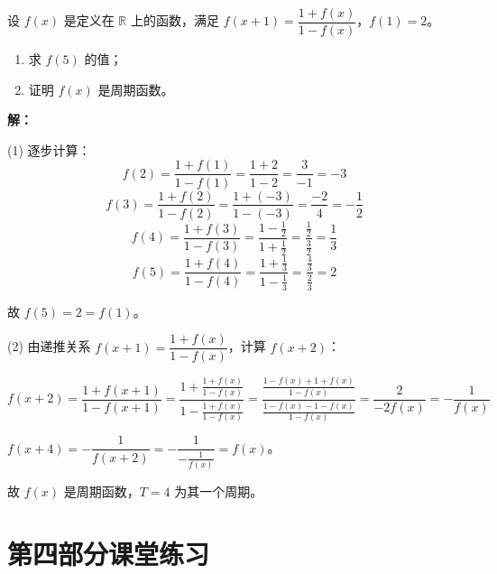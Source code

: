 \documentclass[12pt,a4paper]{ctexart}
\begin{document}
\begin{appbox}[应用题4]
设 $f(x)$ 是定义在 $\mathbb{R}$ 上的函数，满足 $f(x+1)=\dfrac{1+f(x)}{1-f(x)}$，$f(1)=2$。
\begin{enumerate}[label=(\arabic*)]
  \item 求 $f(5)$ 的值；
  \item 证明 $f(x)$ 是周期函数。
\end{enumerate}

\medskip
\textbf{解：}

(1) 逐步计算：
\[f(2)=\frac{1+f(1)}{1-f(1)}=\frac{1+2}{1-2}=\frac{3}{-1}=-3\]
\[f(3)=\frac{1+f(2)}{1-f(2)}=\frac{1+(-3)}{1-(-3)}=\frac{-2}{4}=-\frac{1}{2}\]
\[f(4)=\frac{1+f(3)}{1-f(3)}=\frac{1-\frac{1}{2}}{1+\frac{1}{2}}=\frac{\frac{1}{2}}{\frac{3}{2}}=\frac{1}{3}\]
\[f(5)=\frac{1+f(4)}{1-f(4)}=\frac{1+\frac{1}{3}}{1-\frac{1}{3}}=\frac{\frac{4}{3}}{\frac{2}{3}}=2\]

故 $f(5)=2=f(1)$。

(2) 由递推关系 $f(x+1)=\dfrac{1+f(x)}{1-f(x)}$，计算 $f(x+2)$：

\[f(x+2)=\frac{1+f(x+1)}{1-f(x+1)}=\frac{1+\frac{1+f(x)}{1-f(x)}}{1-\frac{1+f(x)}{1-f(x)}}=\frac{\frac{1-f(x)+1+f(x)}{1-f(x)}}{\frac{1-f(x)-1-f(x)}{1-f(x)}}=\frac{2}{-2f(x)}=-\frac{1}{f(x)}\]

$f(x+4)=-\dfrac{1}{f(x+2)}=-\dfrac{1}{-\frac{1}{f(x)}}=f(x)$。

故 $f(x)$ 是周期函数，$\boxed{T=4}$ 为其一个周期。
\end{appbox}


\newpage
\section*{\textcolor{mainblue}{第四部分\quad 课堂练习}}
\end{document}
